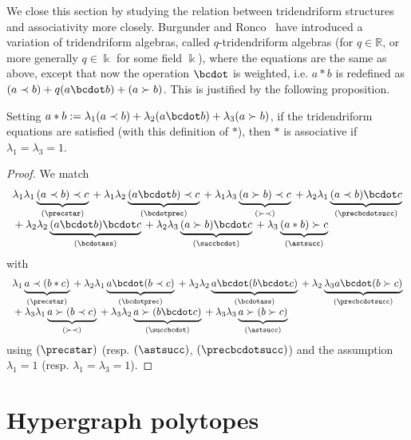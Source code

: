 We close this section by studying the relation between tridendriform structures and associativity more closely.  Burgunder and Ronco~\cite{BR} have introduced a variation of tridendriform algebras, called $q$-tridendriform  algebras (for $q\in \mathbb{R}$, or more generally $q\in {\Bbbk}$ for some field ${\Bbbk}$), where the equations are the same as above, except that now the operation $\bcdot$ is weighted, i.e. $a\ast b$ is redefined as $(a\prec b)+q(a\bcdot b)+(a\succ b)$. This is justified by the following proposition.
\begin{proposition} \label{tridend-implies-ass}
Setting $a\ast b:=\lambda_1(a\prec b)+\lambda_2(a\bcdot b)+\lambda_3(a\succ b)$, if the tridendriform equations are satisfied (with this definition of $\ast$), then $\ast$ is associative if  $\lambda_1=\lambda_3=1$.
\end{proposition} 
\begin{proof} We match
 $$\begin{array}{ll}
 \lambda_1\lambda_1 \underbrace{ (a\prec b)\prec c}_{(\precstar)} \:+\: \lambda_1\lambda_2\underbrace{(a\bcdot b)\prec c}_{(\bcdotprec)} \:+\: \lambda_1\lambda_3 
\underbrace{(a\succ b)\prec c}_{(\succ\prec)}  \:+\: \lambda_2\lambda_1 \underbrace{(a\prec b)\bcdot c}_{(\precbcdotsucc)} \\
 \:+\: \lambda_2\lambda_2 \underbrace{(a\bcdot b)\bcdot c}_{(\bcdotass)}
\:+\: \lambda_2\lambda_3 \underbrace{(a\succ b)\bcdot c}_{(\succbcdot)}  \:+\: \lambda_3\underbrace{ (a\ast b)\succ c}_{(\astsucc)}
 \end{array}$$
 with
 $$\begin{array}{ll}
 \lambda_1 \underbrace{a\prec (b\ast c)}_{(\precstar)}  \:+\:
\lambda_2 \lambda_1 \underbrace{ a\bcdot (b\prec c)}_{(\bcdotprec)} \:+\: \lambda_2\lambda_2 \underbrace{a\bcdot (b\bcdot c)}_{(\bcdotass)}  \:+\: \lambda_2\underbrace{\lambda_3 a\bcdot (b\succ c)}_{(\precbcdotsucc)} \\ 
 \:+\: \lambda_3\lambda_1 \underbrace{a\succ(b\prec c)}_{(\succ\prec)} \:+\: \lambda_3\lambda_2 \underbrace{a\succ(b\bcdot c)}_{(\succbcdot)} \:+\:
\lambda_3\lambda_3 \underbrace{a\succ(b\succ c)}_{(\astsucc)}
\end{array}$$
 using $(\precstar)$ (resp. $(\astsucc)$, $(\precbcdotsucc)$) and the assumption $\lambda_1=1$ (resp.  $\lambda_1 = \lambda_3=1$).
\end{proof}
\section{Hypergraph polytopes} \label{reminders-hypergraph-section}

